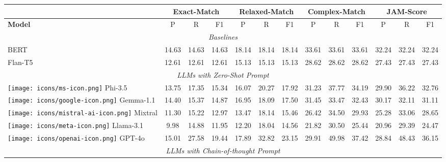\begin{table*}[h!]
\small
\centering
\renewcommand*{\arraystretch}{1.1}

\begin{tabular}{l|ccc|ccc|ccc|ccc}
 & \multicolumn{3}{c}{\textbf{Exact-Match}}& \multicolumn{3}{c}{\textbf{Relaxed-Match}} & \multicolumn{3}{c}{\textbf{Complex-Match}}& \multicolumn{3}{c}{\textbf{JAM-Score}} \\
\midrule
\textbf{Model}& P & R & F1 & P & R & F1  & P & R & F1 & P & R & F1\\
\midrule

\multicolumn{13}{c}{\textit{Baselines }}\\
\midrule
BERT & 14.63 & 14.63 & 14.63 & 18.14 & 18.14 & 18.14 & 33.61 & 33.61 & 33.61 & 32.24 & 32.24 & 32.24\\
Flan-T5 & 12.61 & 12.61 & 12.61 & 15.13 & 15.13 & 15.13 & 28.62 & 28.62 & 28.62 & 27.43 & 27.43 & 27.43 \\

\midrule
\multicolumn{13}{c}{\textit{LLMs with Zero-Shot Prompt}}\\
\midrule

\texttt{[image: icons/ms-icon.png]} Phi-3.5 & 13.75 & 17.35 & 15.34 & 16.07 & 20.27 & 17.92 & 31.23 & 37.77 & 34.19 & 29.90 & 36.22 & 32.76 \\
\texttt{[image: icons/google-icon.png]} Gemma-1.1 & 14.40 & 15.37 & 14.87 & 16.95 & 18.09 & 17.50 & 31.45 & 33.47 & 32.43 & 30.17 & 32.11 & 31.11 \\
\texttt{[image: icons/mistral-ai-icon.png]} Mixtral & 11.30 & 15.22 & 12.97 & 13.47 & 18.14 & 15.46 & 26.42 & 34.50 & 29.93 & 25.28 & 33.06 & 28.65 \\
\texttt{[image: icons/meta-icon.png]} Llama-3.1 & 9.98 & 14.88 & 11.95 & 12.20 & 18.04 & 14.56 & 21.82 & 30.50 & 25.44 &  20.96 & 29.39 & 24.47 \\
\texttt{[image: icons/openai-icon.png]} GPT-4o & 15.01 & 27.58 & 19.44 & 17.89 & 32.82 & 23.15 & 29.91 & 49.98 & 37.42 & 28.84 & 48.43 & 36.15 \\

\midrule
\multicolumn{13}{c}{\textit{LLMs with Chain-of-thought Prompt}}\\
\midrule


\end{tabular}
\end{table*}
